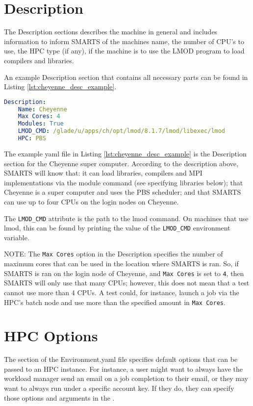 \section{Description}
\label{section:description}

The Description sections describes the machine in general and includes
information to inform SMARTS of the machines name, the number of CPU's
to use, the HPC type (if any), if the machine is to use the LMOD program to
load compilers and libraries.

An example Description section that contains all necessary parts can be found
in Listing \ref{lst:cheyenne_desc_example}.

\begin{lstlisting}[language=yaml, 
                   caption={Examlpe Cheyenne Environment.yaml Description},
                   label={lst:cheyenne_desc_example}]
Description:
    Name: Cheyenne
    Max Cores: 4
    Modules: True
    LMOD_CMD: /glade/u/apps/ch/opt/lmod/8.1.7/lmod/libexec/lmod
    HPC: PBS
\end{lstlisting}

The example yaml file in Listing \ref{lst:cheyenne_desc_example} is the
Description section for the Cheyenne super computer. According to the
description above, SMARTS will know that: it can load libraries, compilers and
MPI implementations via the module command (see specifying libraries below);
that Cheyenne is a super computer and uses the PBS scheduler; and that SMARTS
can use up to four CPUs on the login nodes on Cheyenne.

The {\tt LMOD\_CMD} attribute is the path to the lmod command. On machines that
use lmod, this can be found by printing the value of the {\tt LMOD\_CMD}
environment variable.

NOTE: The {\tt Max Cores} option in the Description specifies the number of
maximum cores that can be used in the location where SMARTS is ran. So, if
SMARTS is ran on the login node of Cheyenne, and {\tt Max Cores} is set to
{\tt 4}, then SMARTS will only use that many CPUs; however, this does not mean
that a test cannot use more than 4 CPUs. A test could, for instance, launch a
job via the HPC's batch node and use more than the specified amount in {\tt Max
Cores}.

\section{HPC Options}
\label{sec:hpc_options}

The \hpcoptions section of the Environment.yaml file specifies default options
that can be passed to an HPC instance. For instance, a user might want to
always have the workload manager send an email on a job completion to their
email, or they may want to always run under a specific account key. If they do,
they can specify those options and arguments in the \hpcoptions.

